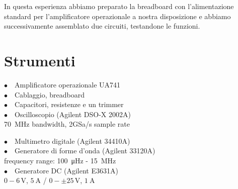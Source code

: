 In questa esperienza abbiamo preparato la breadboard con l'alimentazione standard per l'amplificatore operazionale a nostra disposizione e abbiamo successivamente assemblato due circuiti, testandone le funzioni.

\section{Strumenti}
%
\noindent
\begin{minipage}{.5\linewidth}
$\bullet \quad$Amplificatore operazionale UA741\\
$\bullet \quad$Cablaggio, breadboard\\
$\bullet \quad$Capacitori, resistenze e un trimmer\\
$\bullet \quad$Oscilloscopio (Agilent DSO-X 2002A)\\
\phantom{xxxx}\SI{70}{\mega\hertz} bandwidth, 2GSa/s sample rate\\
\end{minipage}%
\begin{minipage}{.5\linewidth}
$\bullet \quad$Multimetro digitale (Agilent 34410A)\\
$\bullet \quad$Generatore di forme d'onda (Agilent 33120A)\\
\phantom{xxxx}frequency range: \SI{100}{\micro\hertz} - \SI{15}{\mega\hertz}\\
$\bullet \quad$Generatore DC (Agilent E3631A)\\
\phantom{xxxx}$0-6\,\si{\volt}$, $\SI{5}{\ampere}$ / $0-\pm25\,\si{\volt}$, $\SI{1}{\ampere}$\\
\end{minipage}
